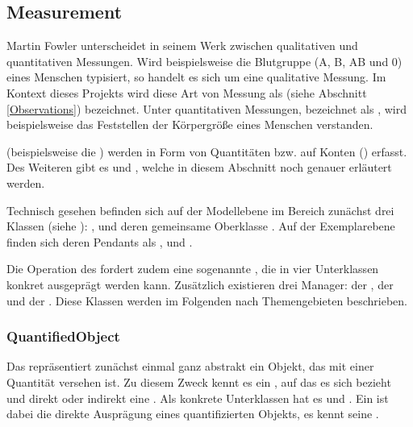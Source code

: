 \subsection{Measurement}
Martin Fowler unterscheidet in seinem Werk  zwischen qualitativen und quantitativen
Messungen. Wird beispielsweise die Blutgruppe (A, B, AB und 0) eines Menschen typisiert, so handelt es sich um
eine qualitative Messung. Im Kontext dieses Projekts wird diese Art von Messung als  (siehe Abschnitt
\ref{Observations}) bezeichnet. Unter quantitativen Messungen, bezeichnet als , wird
beispielsweise das Feststellen der Körpergröße eines Menschen verstanden.


 (beispielsweise die ) werden in Form von Quantitäten bzw.
 auf Konten () erfasst. Des Weiteren gibt es  und
, welche in diesem Abschnitt noch genauer erläutert werden.

Technisch gesehen befinden sich auf der Modellebene im Bereich  zunächst drei Klassen (siehe ):
,  und deren gemeinsame Oberklasse . Auf der
Exemplarebene finden sich deren Pendants als ,  und .

Die Operation  des  fordert zudem eine sogenannte ,
die in vier Unterklassen konkret ausgeprägt werden kann.
Zusätzlich existieren drei Manager: der , der  und der
. Diese Klassen werden im Folgenden nach Themengebieten beschrieben.


\subsubsection{QuantifiedObject}\label{Measurement:QuantifiedObject}
Das  repräsentiert zunächst einmal ganz abstrakt ein Objekt, das mit einer Quantität versehen
ist. Zu diesem Zweck kennt es ein , auf das es sich bezieht und direkt oder indirekt eine .
Als konkrete Unterklassen hat es  und . Ein  ist dabei die
direkte Ausprägung eines quantifizierten Objekts, es kennt seine . 

